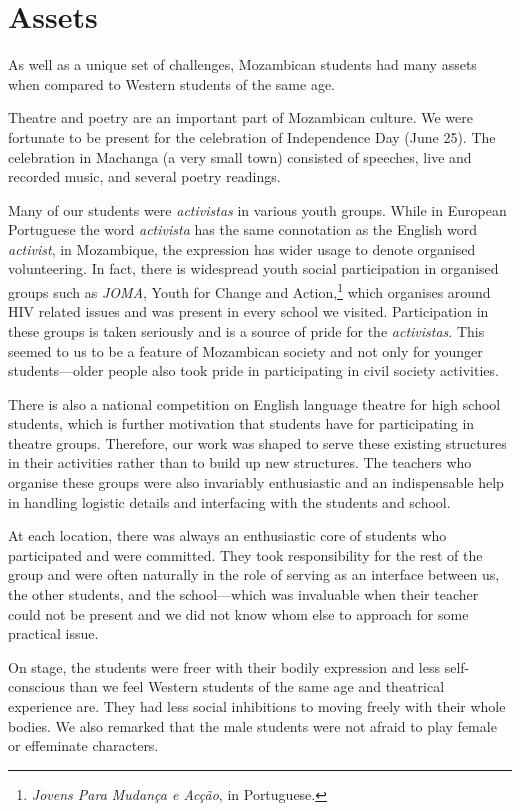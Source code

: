 \documentclass[article,twocolumn,twoside]{memoir}
\begin{document}
\chapter{Assets}
As well as a unique set of challenges, Mozambican students had many assets when
compared to Western students of the same age.

Theatre and poetry are an important part of Mozambican culture. We were
fortunate to be present for the celebration of Independence Day (June 25). The
celebration in Machanga (a very small town) consisted of speeches, live and
recorded music, and several poetry readings.

Many of our students were \textit{activistas} in various youth groups. While in
European Portuguese the word \textit{activista} has the same connotation as the
English word \textit{activist}, in Mozambique, the expression has wider usage
to denote organised volunteering. In fact, there is widespread youth social
participation in organised groups such as \textit{JOMA}, Youth for Change and
Action,\footnote{\textit{Jovens Para Mudança e Acção}, in Portuguese.} which
organises around HIV related issues and was present in every school we visited.
Participation in these groups is taken seriously and is a source of pride for
the \textit{activistas}. This seemed to us to be a feature of Mozambican
society and not only for younger students---older people also took pride in
participating in civil society activities.

There is also a national competition on English language theatre for high
school students, which is further motivation that students have for
participating in theatre groups. Therefore, our work was shaped to serve these
existing structures in their activities rather than to build up new structures.
The teachers who organise these groups were also invariably enthusiastic and an
indispensable help in handling logistic details and interfacing with the
students and school.

At each location, there was always an enthusiastic core of students who
participated and were committed. They took responsibility for the rest of the
group and were often naturally in the role of serving as an interface between
us, the other students, and the school---which was invaluable when their
teacher could not be present and we did not know whom else to approach for some
practical issue.

On stage, the students were freer with their bodily expression and less
self-conscious than we feel Western students of the same age and theatrical
experience are. They had less social inhibitions to moving freely with their
whole bodies. We also remarked that the male students were not afraid to play
female or effeminate characters.
\end{document}
